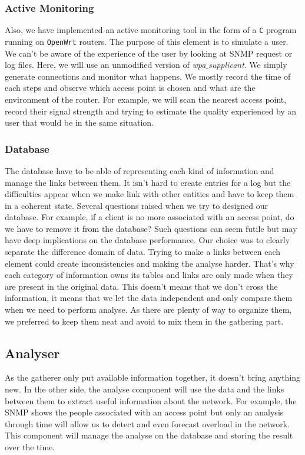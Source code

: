 \subsubsection{Active Monitoring}
Also, we have implemented an active monitoring tool in the form of a \texttt{C} program running on \texttt{OpenWrt} routers. The purpose of this element is to simulate a user. We can't be aware of the experience of the user by looking at SNMP request or log files. Here, we will use an unmodified version of \emph{wpa$\_$supplicant}. We simply generate connections and monitor what happens. We mostly record the time of each steps and observe which access point is chosen and what are the environment of the router. For example, we will scan the nearest access point, record their signal strength and trying to estimate the quality experienced by an user that would be in the same situation.

\subsubsection{Database}
The database have to be able of representing each kind of information and manage the links between them. It isn't hard to create entries for a log but the difficulties appear when we make link with other entities and have to keep them in a coherent state. Several questions raised when we try to designed our database. For example, if a client is no more associated with an access point, do we have to remove it from the database? Such questions can seem futile but may have deep implications on the database performance. Our choice was to clearly separate the difference domain of data. Trying to make a links between each element could create inconsistencies and making the analyse harder. That's why each category of information owns its tables and links are only made when they are present in the original data. This doesn't means that we don't cross the information, it means that we let the data independent and only compare them when we need to perform analyse. As there are plenty of way to organize them, we preferred to keep them neat and avoid to mix them in the gathering part.

\subsection{Analyser}
As the gatherer only put available information together, it doesn't bring anything new. In the other side, the analyse component will use the data and the links between them to extract useful information about the network. For example, the SNMP shows the people associated with an access point but only an analysis through time will allow us to detect and even forecast overload in the network. This component will manage the analyse on the database and storing the result over the time.


